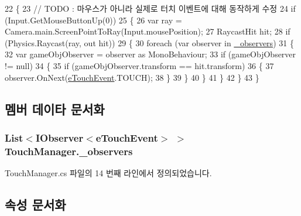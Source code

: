\begin{DoxyCode}
22     \{
23         \textcolor{comment}{// TODO : 마우스가 아니라 실제로 터치 이벤트에 대해 동작하게 수정}
24         \textcolor{keywordflow}{if} (Input.GetMouseButtonUp(0))
25         \{
26             var ray = Camera.main.ScreenPointToRay(Input.mousePosition);
27             RaycastHit hit;
28             \textcolor{keywordflow}{if} (Physics.Raycast(ray, out hit))
29             \{
30                 \textcolor{keywordflow}{foreach} (var observer \textcolor{keywordflow}{in} \hyperlink{class_touch_manager_a90d8ccdafc722f2d17dd0c7c818631c4}{\_observers})
31                 \{
32                     var gameObjObserver = observer as MonoBehaviour;
33                     \textcolor{keywordflow}{if} (gameObjObserver != null)
34                     \{
35                         \textcolor{keywordflow}{if} (gameObjObserver.transform == hit.transform)
36                         \{
37                             observer.OnNext(\hyperlink{_touch_manager_8cs_ae33e321a424fe84ba8b2fdb81ad40a68}{eTouchEvent}.TOUCH);
38                         \}
39                     \}
40                 \}
41             \}
42         \}
43     \}
\end{DoxyCode}


\subsection{멤버 데이타 문서화}
\subsubsection[{\texorpdfstring{\+\_\+observers}{_observers}}]{\setlength{\rightskip}{0pt plus 5cm}List$<${\bf I\+Observer}$<${\bf e\+Touch\+Event}$>$ $>$ Touch\+Manager.\+\_\+observers\hspace{0.3cm}{\ttfamily [private]}}\hypertarget{class_touch_manager_a90d8ccdafc722f2d17dd0c7c818631c4}{}\label{class_touch_manager_a90d8ccdafc722f2d17dd0c7c818631c4}


Touch\+Manager.\+cs 파일의 14 번째 라인에서 정의되었습니다.



\subsection{속성 문서화}
